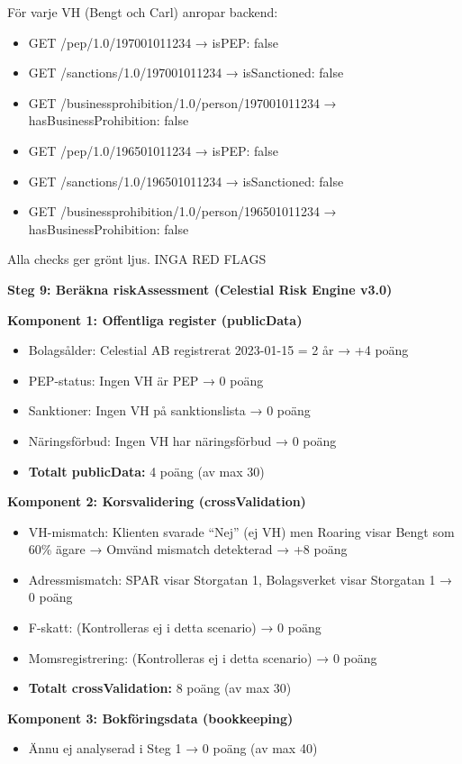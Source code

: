 \documentclass[12pt,a4paper]{article}
\begin{document}
För varje VH (Bengt och Carl) anropar backend:
\begin{itemize}[noitemsep]
  \item GET /pep/1.0/197001011234 → isPEP: false
  \item GET /sanctions/1.0/197001011234 → isSanctioned: false
  \item GET /businessprohibition/1.0/person/197001011234 → hasBusinessProhibition: false
  \item GET /pep/1.0/196501011234 → isPEP: false
  \item GET /sanctions/1.0/196501011234 → isSanctioned: false
  \item GET /businessprohibition/1.0/person/196501011234 → hasBusinessProhibition: false
\end{itemize}

Alla checks ger grönt ljus. INGA RED FLAGS

\textbf{Steg 9: Beräkna riskAssessment (Celestial Risk Engine v3.0)}

\textbf{Komponent 1: Offentliga register (publicData)}
\begin{itemize}[noitemsep]
  \item Bolagsålder: Celestial AB registrerat 2023-01-15 = 2 år → +4 poäng
  \item PEP-status: Ingen VH är PEP → 0 poäng
  \item Sanktioner: Ingen VH på sanktionslista → 0 poäng
  \item Näringsförbud: Ingen VH har näringsförbud → 0 poäng
  \item \textbf{Totalt publicData:} 4 poäng (av max 30)
\end{itemize}

\textbf{Komponent 2: Korsvalidering (crossValidation)}
\begin{itemize}[noitemsep]
  \item VH-mismatch: Klienten svarade \enquote{Nej} (ej VH) men Roaring visar Bengt som 60\% ägare
    → Omvänd mismatch detekterad → +8 poäng
  \item Adressmismatch: SPAR visar Storgatan 1, Bolagsverket visar Storgatan 1 → 0 poäng
  \item F-skatt: (Kontrolleras ej i detta scenario) → 0 poäng
  \item Momsregistrering: (Kontrolleras ej i detta scenario) → 0 poäng
  \item \textbf{Totalt crossValidation:} 8 poäng (av max 30)
\end{itemize}

\textbf{Komponent 3: Bokföringsdata (bookkeeping)}
\begin{itemize}[noitemsep]
  \item Ännu ej analyserad i Steg 1 → 0 poäng (av max 40)
\end{itemize}
\end{document}
